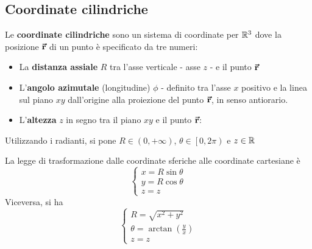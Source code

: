 \subsection{Coordinate cilindriche}
\begin{define}
	Le \textbf{coordinate cilindriche} sono un sistema di coordinate per $\mathbb{R}^3$ dove la posizione $\vb*{\va{r}}$ di un punto è specificato da tre numeri:
	\begin{itemize}
		\item La \textbf{distanza assiale} $R$ tra l'asse verticale - asse $z$ - e il punto $\vb*{\va{r}}$
		\item L'\textbf{angolo azimutale} (longitudine) $\phi$ - definito tra l'asse $x$ positivo e la linea sul piano $xy$ dall'origine alla proiezione del punto $\vb*{\va{r}}$, in senso antiorario.
		\item L'\textbf{altezza} $z$ in segno tra il piano $xy$ e il punto $\vb*{\va{r}}$:
	\end{itemize}
	Utilizzando i radianti, si pone $R\in\left(0,+\infty\right)$, $\theta\in\left[0,2\pi\right)$ e $z\in\mathbb{R}$
\end{define}
La legge di trasformazione dalle coordinate sferiche alle coordinate cartesiane è
\begin{equation}
	\begin{cases}
		x=R\sin\theta\\
		y=R\cos\theta\\
		z=z
	\end{cases}
\end{equation}
Viceversa, si ha
\begin{equation}
	\begin{cases}
		R=\sqrt{x^2+y^2}\\
		\theta=\arctan\left(\frac{y}{x}\right)\\
		z=z
	\end{cases}	
\end{equation}
